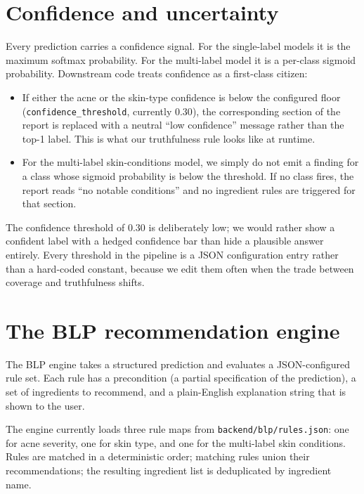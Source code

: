 \documentclass[11pt,a4paper,oneside]{report}
\begin{document}
\section{Confidence and uncertainty}\label{sec:confidence}

Every prediction carries a confidence signal. For the single-label
models it is the maximum softmax probability. For the multi-label
model it is a per-class sigmoid probability. Downstream code
treats confidence as a first-class citizen:

\begin{itemize}
    \item If either the acne or the skin-type confidence is below
        the configured floor (\texttt{confidence\_threshold}, currently
        \(0.30\)), the corresponding section of the report is
        replaced with a neutral ``low confidence'' message rather
        than the top-1 label. This is what our truthfulness rule
        looks like at runtime.
    \item For the multi-label skin-conditions model, we simply do
        not emit a finding for a class whose sigmoid probability is
        below the threshold. If no class fires, the report reads
        ``no notable conditions'' and no ingredient rules are
        triggered for that section.
\end{itemize}

The confidence threshold of \(0.30\) is deliberately low; we would
rather show a confident label with a hedged confidence bar than
hide a plausible answer entirely. Every threshold in the pipeline
is a JSON configuration entry rather than a hard-coded constant,
because we edit them often when the trade between coverage and
truthfulness shifts.

\section{The BLP recommendation engine}\label{sec:blp-engine}

The BLP engine takes a structured prediction and evaluates a
JSON-configured rule set. Each rule has a precondition (a partial
specification of the prediction), a set of ingredients to
recommend, and a plain-English explanation string that is shown to
the user.

The engine currently loads three rule maps from
\texttt{backend/blp/rules.json}: one for acne severity, one for
skin type, and one for the multi-label skin conditions. Rules are
matched in a deterministic order; matching rules union their
recommendations; the resulting ingredient list is deduplicated by
ingredient name.
\end{document}
